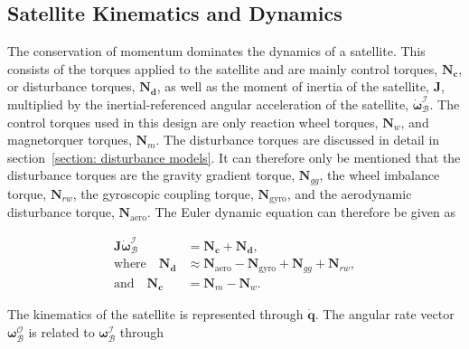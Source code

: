 \subsection{Satellite Kinematics and Dynamics}
The conservation of momentum dominates the dynamics of a satellite. This consists of the torques applied to the satellite and are mainly control torques, $\mathbf{N_c}$, or disturbance torques, $\mathbf{N_d}$, as well as the moment of inertia of the satellite, $\mathbf{J}$, multiplied by the inertial-referenced angular acceleration of the satellite, $\boldsymbol{\dot{\omega}}_{\mathcal{B}}^{\mathcal{I}}$. The control torques used in this design are only reaction wheel torques, $\mathbf{N}_w$, and magnetorquer torques, $\mathbf{N}_m$. The disturbance torques are discussed in detail in section~\ref{section: disturbance models}. It can therefore only be mentioned that the disturbance torques are the gravity gradient torque, $\mathbf{N}_{gg}$, the wheel imbalance torque, $\mathbf{N}_{rw}$, the gyroscopic coupling torque, $\mathbf{N}_{\text{gyro}}$, and the aerodynamic disturbance torque, $\mathbf{N}_{\text{aero}}$. The Euler dynamic equation can therefore be given as

\begin{equation}
\begin{aligned}
	\mathbf{J}\boldsymbol{\dot{\omega}}_{\mathcal{B}}^{\mathcal{I}} &= \mathbf{N_c} + \mathbf{N_d}, \\
	\text{where} \quad \mathbf{N_d} &\approx \mathbf{N}_{\text{aero}} - \mathbf{N}_{\text{gyro}} + \mathbf{N}_{gg} + \mathbf{N}_{rw}, \\
	\text{and} \quad \mathbf{N_c} &= \mathbf{N}_{m} - \mathbf{N}_{w}.
\end{aligned}
\label{Eq-EulerDynamic}
\end{equation}

The kinematics of the satellite is represented through $\dot{\mathbf{q}}$. The angular rate vector $\boldsymbol{\omega}_{\mathcal{B}}^{\mathcal{O}}$ is related to $\boldsymbol{\omega}_{\mathcal{B}}^{\mathcal{I}}$ through

